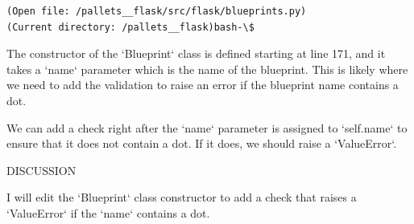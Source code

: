 {\begin{observationbox}
\begin{Verbatim}[breaklines=true, breakanywhere=true]
(Open file: /pallets__flask/src/flask/blueprints.py)
(Current directory: /pallets__flask)bash-\$
\end{Verbatim}
\end{observationbox}
\begin{agentbox}
The constructor of the `Blueprint` class is defined starting at line 171, and it takes a `name` parameter which is the name of the blueprint. This is likely where we need to add the validation to raise an error if the blueprint name contains a dot.



We can add a check right after the `name` parameter is assigned to `self.name` to ensure that it does not contain a dot. If it does, we should raise a `ValueError`.



DISCUSSION

I will edit the `Blueprint` class constructor to add a check that raises a `ValueError` if the `name` contains a dot.




\end{agentbox}}
